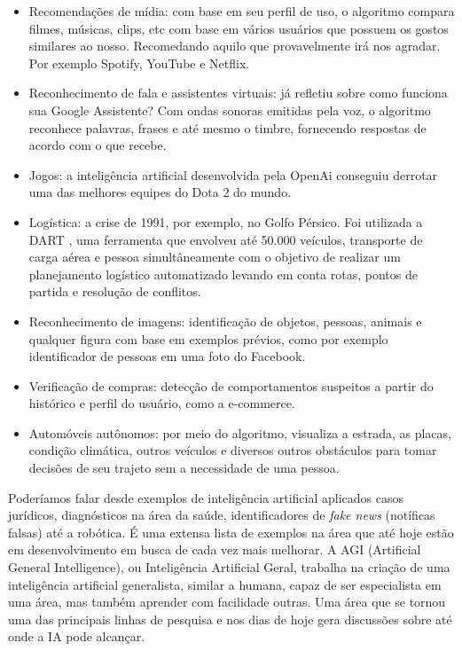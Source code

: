 \documentclass[
]{book}
\begin{document}
\begin{itemize}
\item
  Recomendações de mídia: com base em seu perfil de uso, o algoritmo compara filmes, músicas, clips, etc com base em vários usuários que possuem os gostos similares ao nosso. Recomedando aquilo que provavelmente irá nos agradar. Por exemplo Spotify, YouTube e Netflix.
\item
  Reconhecimento de fala e assistentes virtuais: já refletiu sobre como funciona sua Google Assistente? Com ondas sonoras emitidas pela voz, o algoritmo reconhece palavras, frases e até mesmo o timbre, fornecendo respostas de acordo com o que recebe.
\item
  Jogos: a inteligência artificial desenvolvida pela OpenAi conseguiu derrotar uma das melhores equipes do Dota 2 do mundo.
\item
  Logística: a crise de 1991, por exemplo, no Golfo Pérsico. Foi utilizada a DART \citep{cross1994dart}, uma ferramenta que envolveu até 50.000 veículos, transporte de carga aérea e pessoa simultâneamente com o objetivo de realizar um planejamento logístico automatizado levando em conta rotas, pontos de partida e resolução de conflitos.
\item
  Reconhecimento de imagens: identificação de objetos, pessoas, animais e qualquer figura com base em exemplos prévios, como por exemplo identificador de pessoas em uma foto do Facebook.
\item
  Verificação de compras: detecção de comportamentos suspeitos a partir do histórico e perfil do usuário, como a e-commerce.
\item
  Automóveis autônomos: por meio do algoritmo, visualiza a estrada, as placas, condição climática, outros veículos e diversos outros obstáculos para tomar decisões de seu trajeto sem a necessidade de uma pessoa.
\end{itemize}

Poderíamos falar desde exemplos de inteligência artificial aplicados casos jurídicos, diagnósticos na área da saúde, identificadores de \emph{fake news} (notíficas falsas) até a robótica. É uma extensa lista de exemplos na área que até hoje estão em desenvolvimento em busca de cada vez mais melhorar. A AGI (Artificial General Intelligence), ou Inteligência Artificial Geral, trabalha na criação de uma inteligência artificial generalista, similar a humana, capaz de ser especialista em uma área, mas também aprender com facilidade outras. Uma área que se tornou uma das principais linhas de pesquisa e nos dias de hoje gera discussões sobre até onde a IA pode alcançar.
\end{document}
